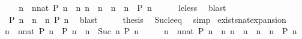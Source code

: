 \begin{isabellebody}
%
\isadelimproof
%
\endisadelimproof
%
\isatagproof
{}\isamarkupfalse%
\ {\isacharminus}\isanewline
\ \ \isamarkupfalse%
\ {\isacartoucheopen}{\isacharparenleft}{\isasymforall}n\ {\isasymge}\ {\isacharparenleft}nnat{\isacharparenright}{\isachardot}\ P\ n{\isacharparenright}\ {\isacharequal}\ {\isacharparenleft}{\isasymforall}n{\isachardot}\ {\isacharparenleft}n\ {\isacharequal}\ n\ {\isasymor}\ n\ {\isachargreater}\ n\ {\isasymlongrightarrow}\ P\ n{\isacharparenright}{\isacartoucheclose}\isanewline
\ \ \ \ \isamarkupfalse%
\ le{\isacharunderscore}less\ \isamarkupfalse%
\ blast\isanewline
\ \ \isamarkupfalse%
\ \isamarkupfalse%
\ {\isacartoucheopen}{\isachardot}{\isachardot}{\isachardot}\ {\isacharequal}\ {\isacharparenleft}P\ n\ {\isasymand}\ {\isacharparenleft}{\isasymforall}n\ {\isachargreater}\ n\ P\ n{\isacharparenright}{\isacharparenright}{\isacartoucheclose}\ \isamarkupfalse%
\ blast\isanewline
\ \ \isamarkupfalse%
\ \isamarkupfalse%
\ {\isacharquery}thesis\ \isamarkupfalse%
\ Suc{\isacharunderscore}le{\isacharunderscore}eq\ \isamarkupfalse%
\ simp\isanewline
{}\isamarkupfalse%
%
\endisatagproof
{\isafoldproof}%
%
\isadelimproof
\isanewline
%
\endisadelimproof
\isanewline
{}\isamarkupfalse%
\ exists{\isacharunderscore}nat{\isacharunderscore}expansion{\isacharcolon}\isanewline
\ \ {\isacartoucheopen}{\isacharparenleft}{\isasymexists}n\ {\isasymge}\ {\isacharparenleft}nnat{\isacharparenright}{\isachardot}\ P\ n{\isacharparenright}\ {\isacharequal}\ {\isacharparenleft}P\ n\ {\isasymor}\ {\isacharparenleft}{\isasymexists}n\ {\isasymge}\ Suc\ n\ P\ n{\isacharparenright}{\isacharparenright}{\isacartoucheclose}\isanewline
%
\isadelimproof
%
\endisadelimproof
%
\isatagproof
{}\isamarkupfalse%
\ {\isacharminus}\isanewline
\ \ \isamarkupfalse%
\ {\isacartoucheopen}{\isacharparenleft}{\isasymexists}n\ {\isasymge}\ {\isacharparenleft}nnat{\isacharparenright}{\isachardot}\ P\ n{\isacharparenright}\ {\isacharequal}\ {\isacharparenleft}{\isasymexists}n{\isachardot}\ {\isacharparenleft}n\ {\isacharequal}\ n\ {\isasymor}\ n\ {\isachargreater}\ n\ {\isasymand}\ P\ n{\isacharparenright}{\isacartoucheclose}\isanewline

\end{isabellebody}
